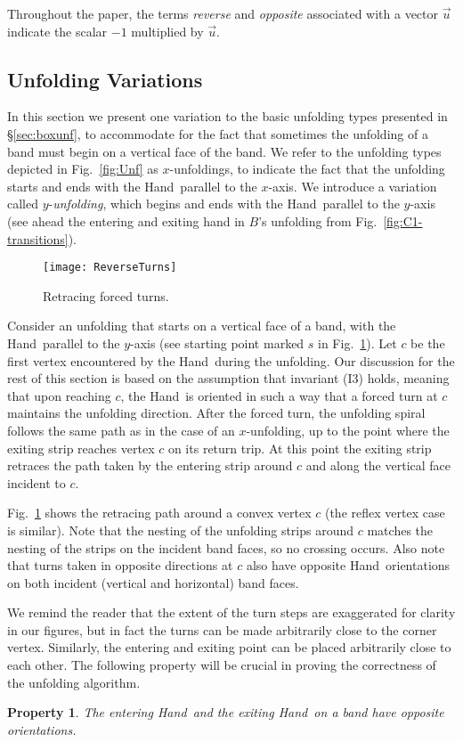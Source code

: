 \documentclass[11pt]{article}
\newtheorem{property}[theorem]{Property}
\newcommand\hand{{\sc Hand}}
\begin{document}
Throughout the paper, the terms \emph{reverse} and \emph{opposite} associated with a vector $\overrightarrow{u}$ indicate the scalar $-1$ multiplied by $\overrightarrow{u}$. 

\subsection{Unfolding Variations}
\label{sec:kinunf}
In this section we present one variation to the basic unfolding types presented in \S\ref{sec:boxunf}, to accommodate for the fact that sometimes the unfolding of a band must begin on a vertical face of the band. We refer to the unfolding types depicted in Fig.~\ref{fig:Unf} as $x$-unfoldings, to indicate the fact that the unfolding starts and ends with the \hand\ parallel to the $x$-axis. We introduce a variation called $y$-\emph{unfolding}, which begins and ends with the \hand\ parallel to the $y$-axis (see ahead the entering and exiting hand in $B$'s unfolding from Fig.~\ref{fig:C1-transitions}). 
\begin{figure}[htbp]
\centering
\texttt{[image: ReverseTurns]}
\caption{Retracing forced turns.}
\label{fig:reverseturns}
\end{figure}


Consider an unfolding that starts on a vertical face of a band, with the \hand\ parallel to the $y$-axis (see starting point marked $s$ in Fig.~\ref{fig:reverseturns}). 
Let $c$ be the first vertex encountered by the \hand\ during the unfolding. Our discussion for the rest of this section is based on the assumption that invariant (I3) holds, meaning that upon reaching $c$, the \hand\ is oriented in such a way that a forced turn at $c$ maintains the unfolding direction. After the forced turn, the unfolding spiral follows the same path as in the case of an $x$-unfolding, up to the point where the exiting strip reaches vertex $c$ on its return trip. At this point the exiting strip retraces the path taken by the entering strip around $c$ and along the vertical face incident to $c$.

Fig.~\ref{fig:reverseturns} shows the retracing path around a convex vertex $c$ (the reflex vertex case is similar). 
Note that the nesting of the unfolding strips around $c$ matches the nesting of the strips on the incident band faces, so no crossing occurs. Also note that turns taken in opposite directions at $c$ also have opposite \hand\ orientations on both incident (vertical and horizontal) band faces.

We remind the reader that the extent of the turn steps are exaggerated for clarity in our figures, but in fact the turns can be made arbitrarily close to the corner vertex. Similarly, the entering and exiting point can be placed arbitrarily close to each other. The following property will be crucial in proving the correctness of the unfolding algorithm.
\begin{property}
The entering \hand\ and the exiting \hand\ on a band have opposite orientations. 
\label{prop:handexit}
\end{property}
\end{document}
